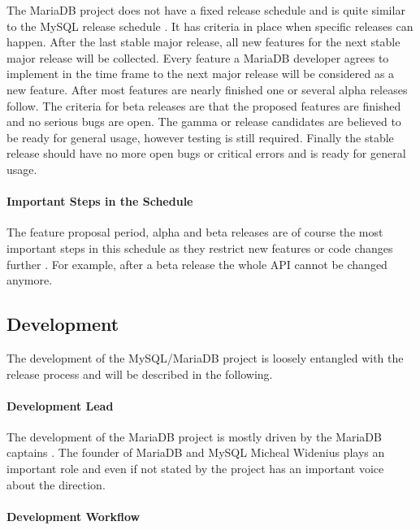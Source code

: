The MariaDB project does not have a fixed release schedule and is quite similar
to the MySQL release schedule
\cite{MySQLReleaseCriteria,MySQLRoadmap,MySQLPlans}. It has criteria in place
when specific releases can happen. After the last stable major release, all new
features for the next stable major release will be collected. Every feature a
MariaDB developer agrees to implement in the time frame to the next major
release will be considered as a new feature. After most features are nearly
finished one or several alpha releases follow. The criteria for beta releases
are that the proposed features are finished and no serious bugs are open. The
gamma or release candidates are believed to be ready for general usage, however
testing is still required. Finally the stable release should have no more open
bugs or critical errors and is ready for general usage.

\paragraph{Important Steps in the Schedule}

The feature proposal period, alpha and beta releases are of course the most
important steps in this schedule as they restrict new features or code changes
further \cite{MySQLReleaseCriteria}. For example, after a beta release the
whole \ac{API} cannot be changed anymore.

\subsection{Development}

The development of the MySQL/MariaDB project is loosely entangled with the
release process and will be described in the following.

\paragraph{Development Lead}

The development of the MariaDB project is mostly driven by the MariaDB captains
\cite{MySQLContributing,MySQLDevelopers}. The founder of MariaDB and MySQL
Micheal Widenius plays an important role and even if not stated by the project
has an important voice about the direction.

\paragraph{Development Workflow}

